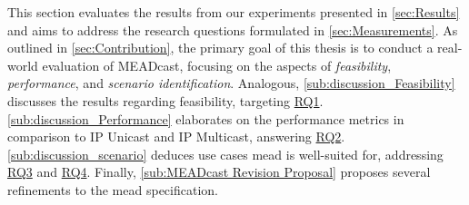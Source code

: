 This section evaluates the results from our experiments presented in
    \autoref{sec:Results} and aims to address the research questions
    formulated in \autoref{sec:Measurements}.
As outlined in \autoref{sec:Contribution}, the primary goal of this thesis is
    to conduct a real-world evaluation of MEADcast, focusing on the aspects of
    \textit{feasibility}, \textit{performance}, and \textit{scenario
    identification}.
Analogous, \autoref{sub:discussion_Feasibility} discusses the results regarding
    feasibility, targeting \hyperref[rq1]{RQ1}.
\autoref{sub:discussion_Performance} elaborates on the performance metrics
    in comparison to IP Unicast and IP Multicast, answering \hyperref[rq2]{RQ2}.
\autoref{sub:discussion_scenario} deduces use cases \gls{mead} is well-suited
    for, addressing \hyperref[rq3]{RQ3} and \hyperref[rq4]{RQ4}.
Finally, \autoref{sub:MEADcast Revision Proposal} proposes several refinements
    to the \gls{mead} specification.

